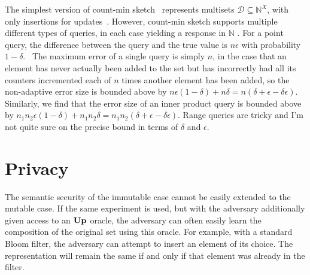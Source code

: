 \documentclass[11pt, pdftex]{article}
\newcommand{\UPO}{\oraclefont{Up}}
\begin{document}
The simplest version of count-min sketch~\cite{xxx} represents multisets $\mathcal{D} \subseteq \mathbb{N}^X$, with only insertions for updates~. However, count-min sketch supports multiple different types of queries, in each case yielding a response in $\mathbb{N}$ . For a point query, the difference between the query and the true value is $n\epsilon$ with probability $1-\delta$.~ The maximum error of a single query is simply $n$, in the case that an element has never actually been added to the set but has incorrectly had all its counters incremented each of $n$ times another element has been added, so the non-adaptive error size is bounded above by $n\epsilon(1-\delta)+n\delta = n(\delta+\epsilon-\delta\epsilon)$. Similarly, we find that the error size of an inner product query is bounded above by $n_1n_2\epsilon(1-\delta)+n_1n_2\delta = n_1n_2(\delta+\epsilon-\delta\epsilon)$. Range queries are tricky and I'm not quite sure on the precise bound in terms of $\delta$ and $\epsilon$.

\section{Privacy}

The semantic security of the immutable case cannot be easily extended to the mutable case. If the same experiment is used, but with the adversary additionally given access to an $\UPO$ oracle, the adversary can often easily learn the composition of the original set using this oracle. For example, with a standard Bloom filter, the adversary can attempt to insert an element of its choice. The representation will remain the same if and only if that element was already in the filter.
\end{document}
